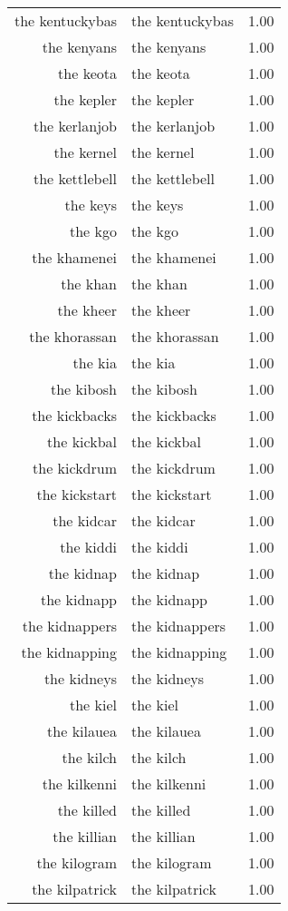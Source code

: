 \begin{table}[ht]
\begin{tabular}{rlr}
  the kentuckybas & the kentuckybas & 1.00 \\ 
  the kenyans & the kenyans & 1.00 \\ 
  the keota & the keota & 1.00 \\ 
  the kepler & the kepler & 1.00 \\ 
  the kerlanjob & the kerlanjob & 1.00 \\ 
  the kernel & the kernel & 1.00 \\ 
  the kettlebell & the kettlebell & 1.00 \\ 
  the keys & the keys & 1.00 \\ 
  the kgo & the kgo & 1.00 \\ 
  the khamenei & the khamenei & 1.00 \\ 
  the khan & the khan & 1.00 \\ 
  the kheer & the kheer & 1.00 \\ 
  the khorassan & the khorassan & 1.00 \\ 
  the kia & the kia & 1.00 \\ 
  the kibosh & the kibosh & 1.00 \\ 
  the kickbacks & the kickbacks & 1.00 \\ 
  the kickbal & the kickbal & 1.00 \\ 
  the kickdrum & the kickdrum & 1.00 \\ 
  the kickstart & the kickstart & 1.00 \\ 
  the kidcar & the kidcar & 1.00 \\ 
  the kiddi & the kiddi & 1.00 \\ 
  the kidnap & the kidnap & 1.00 \\ 
  the kidnapp & the kidnapp & 1.00 \\ 
  the kidnappers & the kidnappers & 1.00 \\ 
  the kidnapping & the kidnapping & 1.00 \\ 
  the kidneys & the kidneys & 1.00 \\ 
  the kiel & the kiel & 1.00 \\ 
  the kilauea & the kilauea & 1.00 \\ 
  the kilch & the kilch & 1.00 \\ 
  the kilkenni & the kilkenni & 1.00 \\ 
  the killed & the killed & 1.00 \\ 
  the killian & the killian & 1.00 \\ 
  the kilogram & the kilogram & 1.00 \\ 
  the kilpatrick & the kilpatrick & 1.00 \\ 

\end{tabular}
\end{table}
